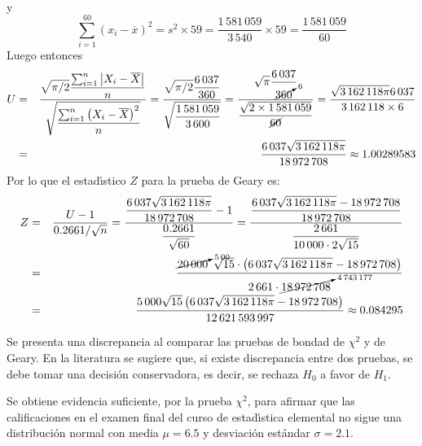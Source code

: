 \begin{solucion}
\begin{estadistico}
\begin{eqnarray*}
  \end{eqnarray*}
  y
  \begin{equation*}
   \sum_{i=1}^{60} \left( x_i - \overline{x} \right)^2 = s^2\times 59 =
   \frac{1\,581\,059}{3\,540} \times 59 = \frac{1\,581\,059}{60}
  \end{equation*}
  Luego entonces
  \begin{eqnarray*}
   U & = & \frac{
   \displaystyle{\sqrt{\pi/2}
   \frac{\sum_{i=1}^n \left| X_i - \overline{X} \right|}{n}}
   }{
   \displaystyle{\sqrt{
   \frac{\sum_{i =1}^n \left( X_i - \overline{X} \right)^2}{n}}}
   } 
   = \frac{\displaystyle{\sqrt{\pi/2} \frac{6\,037}{360}}}{
   \displaystyle{\sqrt{ \frac{1\,581\,059}{3\,600} }}}
   = \frac{\displaystyle{\sqrt{\pi} \frac{6\,037}{\cancelto{6}{360}}}}{
   \displaystyle{ \frac{\sqrt{2 \times 1\,581\,059}}{\cancel{60}} }}
   = \frac{\sqrt{3\,162\,118\pi} 6\,037}{3\,162\,118\times 6} \\
   & = & \frac{6\,037\sqrt{3\,162\,118\pi}}{18\,972\,708}
   \approx 1.00289583
  \end{eqnarray*}
  Por lo que el estad\'{\i}stico $Z$ para la prueba de Geary es:
  \begin{eqnarray*}
   Z & = & \frac{U - 1}{0.2661/\sqrt{n}} = 
   \frac{\displaystyle{\frac{6\,037\sqrt{3\,162\,118\pi}}{18\,972\,708} - 1}
   }{\displaystyle{\frac{0.2661}{\sqrt{60}}}}
   = \frac{\displaystyle{
   \frac{6\,037\sqrt{3\,162\,118\pi} - 18\,972\,708}{18\,972\,708}}}{
   \displaystyle{\frac{2\,661}{10\,000\cdot 2\sqrt{15}}}} \\
   & = & \frac{\cancelto{5\,00}{20\,000}\,\,\,\sqrt{15} \cdot
   \left(6\,037\sqrt{3\,162\,118\pi} - 18\,972\,708\right)}{
   2\,661\cdot \cancelto{4\,743\,177}{18\,972\,708}} \\
   & = & \frac{5\,000\sqrt{15}\left(
   6\,037\sqrt{3\,162\,118\pi}-18\,972\,708\right)}{
   12\,621\,593\,997} \approx 0.084295 \\
  \end{eqnarray*}
 \end{estadistico}

 \begin{decision}
  Se presenta una discrepancia al comparar las pruebas de bondad de $\chi^2$
  y de Geary.
  En la literatura se sugiere que, si existe discrepancia entre dos pruebas,
  se debe tomar una decisi\'on conservadora, es decir,
  se rechaza $H_0$ a favor de $H_1$.
 \end{decision}

 \begin{conclusion}
  Se obtiene evidencia suficiente, por la prueba $\chi^2$, para afirmar
  que las calificaciones en el examen final del curso de estad\'{\i}stica
  elemental no sigue una distribuci\'on normal con media $\mu = 6.5$
  y desviaci\'on est\'andar $\sigma = 2.1$.
 \end{conclusion}
 

\end{solucion}
